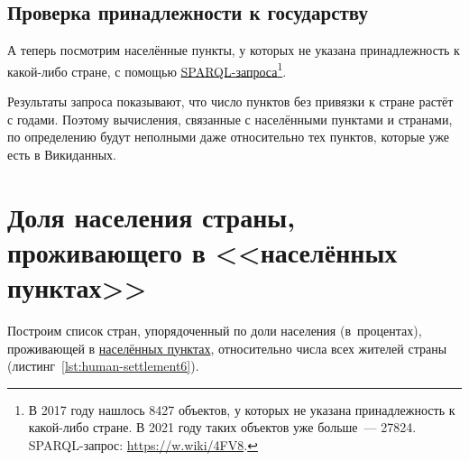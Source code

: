 \subsection{Проверка принадлежности к государству}

А теперь посмотрим населённые пункты, 
у которых не указана принадлежность к какой-либо стране, 
с помощью \href{https://w.wiki/4FV8}{SPARQL-запроса}\footnote{%
%
    В 2017 году нашлось \num{8427} объектов, у которых не указана принадлежность к какой-либо стране. 
    В 2021 году таких объектов уже больше~--- \num{27824}.\newline
    SPARQL-запрос: \href{https://w.wiki/4FV8}{https://w.wiki/4FV8}.%
}. 

Результаты запроса показывают, что число пунктов без привязки к стране растёт с годами. 
Поэтому вычисления, связанные с населёнными пунктами и странами, 
по определению будут неполными даже относительно тех пунктов, которые уже есть в Викиданных. 



\section{Доля населения страны, проживающего в <<населённых пунктах>>}

Построим список стран, 
упорядоченный по доли населения (в~процентах), проживающей в \href{http://www.wikidata.org/entity/Q486972}{населённых пунктах}, относительно числа всех жителей страны (листинг~\ref{lst:human-settlement6}).


